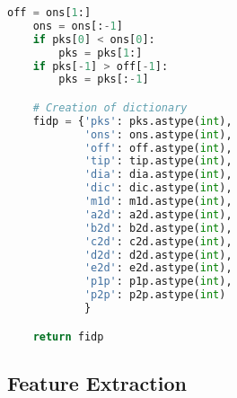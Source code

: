 \begin{lstlisting}[language=Python,label={lst:fidp.py}, basicstyle=\scriptsize]
    off = ons[1:]
    ons = ons[:-1]
    if pks[0] < ons[0]:
        pks = pks[1:]
    if pks[-1] > off[-1]:
        pks = pks[:-1]

    # Creation of dictionary
    fidp = {'pks': pks.astype(int),
            'ons': ons.astype(int),
            'off': off.astype(int),
            'tip': tip.astype(int),
            'dia': dia.astype(int),
            'dic': dic.astype(int),
            'm1d': m1d.astype(int),
            'a2d': a2d.astype(int),
            'b2d': b2d.astype(int),
            'c2d': c2d.astype(int),
            'd2d': d2d.astype(int),
            'e2d': e2d.astype(int),
            'p1p': p1p.astype(int),
            'p2p': p2p.astype(int)
            }

    return fidp

\end{lstlisting}

\subsection{Feature Extraction}
\label{subsec:code_fe}

